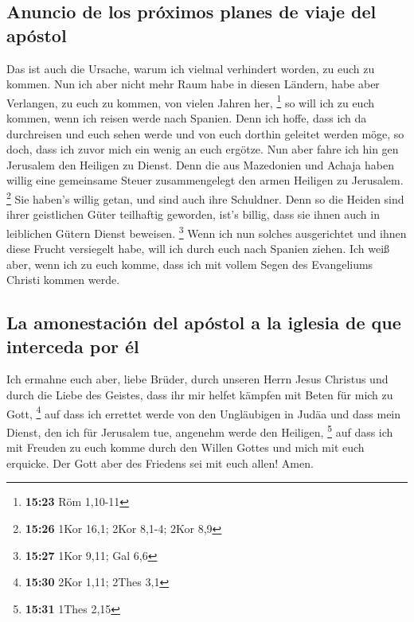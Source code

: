 \hypertarget{anuncio-de-los-pruxf3ximos-planes-de-viaje-del-apuxf3stol}{%
\subsection{Anuncio de los próximos planes de viaje del
apóstol}\label{anuncio-de-los-pruxf3ximos-planes-de-viaje-del-apuxf3stol}}

 Das ist auch die Ursache, warum ich vielmal verhindert
worden, zu euch zu kommen.  Nun ich aber nicht mehr Raum
habe in diesen Ländern, habe aber Verlangen, zu euch zu kommen, von
vielen Jahren her, \footnote{\textbf{15:23} Röm 1,10-11} 
so will ich zu euch kommen, wenn ich reisen werde nach Spanien. Denn ich
hoffe, dass ich da durchreisen und euch sehen werde und von euch dorthin
geleitet werden möge, so doch, dass ich zuvor mich ein wenig an euch
ergötze.  Nun aber fahre ich hin gen Jerusalem den
Heiligen zu Dienst.  Denn die aus Mazedonien und Achaja
haben willig eine gemeinsame Steuer zusammengelegt den armen Heiligen zu
Jerusalem. \footnote{\textbf{15:26} 1Kor 16,1; 2Kor 8,1-4; 2Kor 8,9}
 Sie haben's willig getan, und sind auch ihre Schuldner.
Denn so die Heiden sind ihrer geistlichen Güter teilhaftig geworden,
ist's billig, dass sie ihnen auch in leiblichen Gütern Dienst beweisen.
\footnote{\textbf{15:27} 1Kor 9,11; Gal 6,6}  Wenn ich
nun solches ausgerichtet und ihnen diese Frucht versiegelt habe, will
ich durch euch nach Spanien ziehen.  Ich weiß aber, wenn
ich zu euch komme, dass ich mit vollem Segen des Evangeliums Christi
kommen werde.

\hypertarget{la-amonestaciuxf3n-del-apuxf3stol-a-la-iglesia-de-que-interceda-por-uxe9l}{%
\subsection{La amonestación del apóstol a la iglesia de que interceda
por
él}\label{la-amonestaciuxf3n-del-apuxf3stol-a-la-iglesia-de-que-interceda-por-uxe9l}}

 Ich ermahne euch aber, liebe Brüder, durch unseren Herrn
Jesus Christus und durch die Liebe des Geistes, dass ihr mir helfet
kämpfen mit Beten für mich zu Gott, \footnote{\textbf{15:30} 2Kor 1,11;
  2Thes 3,1}  auf dass ich errettet werde von den
Ungläubigen in Judäa und dass mein Dienst, den ich für Jerusalem tue,
angenehm werde den Heiligen, \footnote{\textbf{15:31} 1Thes 2,15}
 auf dass ich mit Freuden zu euch komme durch den Willen
Gottes und mich mit euch erquicke.  Der Gott aber des
Friedens sei mit euch allen! Amen.

